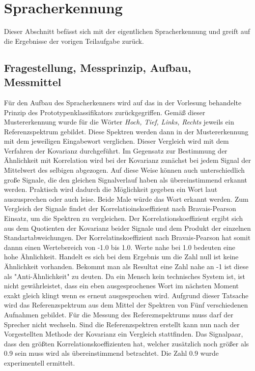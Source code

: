 %
%
\chapter{Spracherkennung}
Dieser Abschnitt befässt sich mit der eigentlichen Spracherkennung und greift auf die Ergebnisse der vorigen Teilaufgabe zurück.
\label{chap:FrequenzgangVonLautsprechern}
\section{Fragestellung, Messprinzip, Aufbau, Messmittel}
\label{chap:VERSUCH_2_FRAGESTELLUNG}
Für den Aufbau des Spracherkenners wird auf das in der Vorlesung behandelte Prinzip
des Prototypenklassifikators zurückgegriffen. \cite[S.24]{Franz2015i}
Gemäß dieser Mustererkennung wurde für die Wörter \textit{Hoch, Tief, Links, Rechts} jeweils ein Referenzspektrum gebildet. Diese Spektren werden dann in der Mustererkennung mit dem jeweiligen Eingabewort verglichen. Dieser Vergleich wird mit dem Verfahren der Kovarianz durchgeführt. Im Gegensatz zur Bestimmung der Ähnlichkeit mit Korrelation wird bei der Kovarianz zunächst bei jedem Signal der Mittelwert des selbigen abgezogen. Auf diese Weise können auch unterschiedlich große Signale, die den gleichen Signalverlauf haben als übereinstimmend erkannt werden. Praktisch wird dadurch die Möglichkeit gegeben ein Wort laut auszusprechen oder auch leise. Beide Male würde das Wort erkannt werden. Zum Vergleich der Signale findet der Korrelatioinskoeffizient nach Bravais-Pearson Einsatz, um die Spektren zu vergleichen.
Der Korrelationskoeffizient ergibt sich aus dem Quotienten der Kovarianz beider Signale und dem Produkt der einzelnen Standartabweichungen. Der Korrelatinskoeffizient nach Bravais-Pearson hat somit dannn einen Wertebereich von -1.0 bis 1.0. Werte nahe bei 1.0 bedeuten eine hohe Ähnlichkeit. Handelt es sich bei dem Ergebnis um die Zahl null ist keine Ähnlichkeit vorhanden. Bekommt man als Resultat eine Zahl nahe an -1 ist diese als "Anti-Ähnlichkeit" zu deuten.\cite[S.27]{Franz2015i}
Da ein Mensch kein technisches System ist, ist nicht gewährleistet, dass ein eben ausgesprochenes Wort im nächsten Moment exakt gleich klingt wenn es erneut ausgesprochen wird. Aufgrund dieser Tatsache wird das Referenzspektrum aus dem Mittel der Spektren von Fünf verschiedenen Aufnahmen gebildet. Für die Messung des Refereznspektrums muss darf der Sprecher nicht wechseln.
Sind die Referenzspektren erstellt kann nun nach der Vorgestellten Methode der Kovarianz ein Vergleich stattfinden. Das Signalpaar, dass den größten Korrelationskoeffizienten hat, welcher zusätzlich noch größer als 0.9 sein muss wird als übereinstimmend betrachtet. Die Zahl 0.9 wurde experimentell ermittelt.
